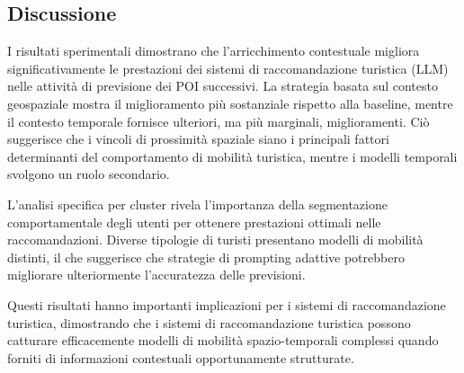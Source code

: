 \subsection{Discussione}

I risultati sperimentali dimostrano che l'arricchimento contestuale migliora significativamente le prestazioni dei sistemi di raccomandazione turistica (LLM) nelle attività di previsione dei POI successivi. La strategia basata sul contesto geospaziale mostra il miglioramento più sostanziale rispetto alla baseline, mentre il contesto temporale fornisce ulteriori, ma più marginali, miglioramenti. Ciò suggerisce che i vincoli di prossimità spaziale siano i principali fattori determinanti del comportamento di mobilità turistica, mentre i modelli temporali svolgono un ruolo secondario.

L'analisi specifica per cluster rivela l'importanza della segmentazione comportamentale degli utenti per ottenere prestazioni ottimali nelle raccomandazioni. Diverse tipologie di turisti presentano modelli di mobilità distinti, il che suggerisce che strategie di prompting adattive potrebbero migliorare ulteriormente l'accuratezza delle previsioni.

Questi risultati hanno importanti implicazioni per i sistemi di raccomandazione turistica, dimostrando che i sistemi di raccomandazione turistica possono catturare efficacemente modelli di mobilità spazio-temporali complessi quando forniti di informazioni contestuali opportunamente strutturate.

